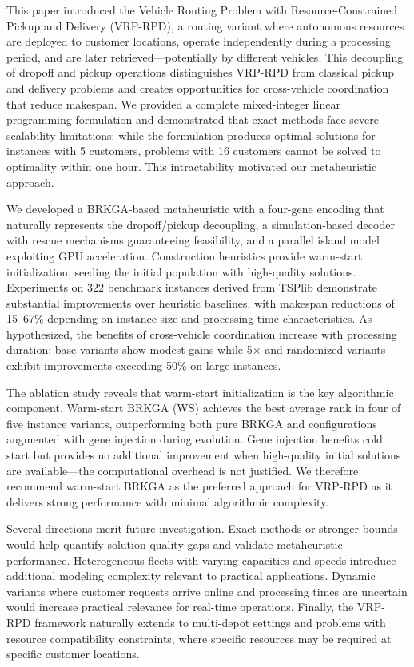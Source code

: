 \documentclass[sigconf]{acmart}
\begin{document}
This paper introduced the Vehicle Routing Problem with Resource-Constrained Pickup and Delivery (VRP-RPD), a routing variant where autonomous resources are deployed to customer locations, operate independently during a processing period, and are later retrieved---potentially by different vehicles. This decoupling of dropoff and pickup operations distinguishes VRP-RPD from classical pickup and delivery problems and creates opportunities for cross-vehicle coordination that reduce makespan. We provided a complete mixed-integer linear programming formulation and demonstrated that exact methods face severe scalability limitations: while the formulation produces optimal solutions for instances with 5 customers, problems with 16 customers cannot be solved to optimality within one hour. This intractability motivated our metaheuristic approach.

We developed a BRKGA-based metaheuristic with a four-gene encoding that naturally represents the dropoff/pickup decoupling, a simulation-based decoder with rescue mechanisms guaranteeing feasibility, and a parallel island model exploiting GPU acceleration. Construction heuristics provide warm-start initialization, seeding the initial population with high-quality solutions. Experiments on 322 benchmark instances derived from TSPlib demonstrate substantial improvements over heuristic baselines, with makespan reductions of 15--67\% depending on instance size and processing time characteristics. As hypothesized, the benefits of cross-vehicle coordination increase with processing duration: base variants show modest gains while 5$\times$ and randomized variants exhibit improvements exceeding 50\% on large instances.

The ablation study reveals that warm-start initialization is the key algorithmic component. Warm-start BRKGA (WS) achieves the best average rank in four of five instance variants, outperforming both pure BRKGA and configurations augmented with gene injection during evolution. Gene injection benefits cold start but provides no additional improvement when high-quality initial solutions are available---the computational overhead is not justified. We therefore recommend warm-start BRKGA as the preferred approach for VRP-RPD as it delivers strong performance with minimal algorithmic complexity.

Several directions merit future investigation. Exact methods or stronger bounds would help quantify solution quality gaps and validate metaheuristic performance. Heterogeneous fleets with varying capacities and speeds introduce additional modeling complexity relevant to practical applications. Dynamic variants where customer requests arrive online and processing times are uncertain would increase practical relevance for real-time operations. Finally, the VRP-RPD framework naturally extends to multi-depot settings and problems with resource compatibility constraints, where specific resources may be required at specific customer locations.
\end{document}
